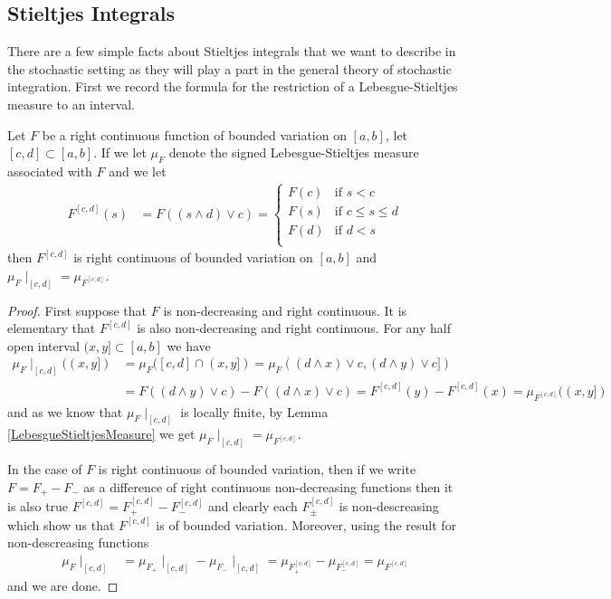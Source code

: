 \subsection{Stieltjes Integrals}

There are a few simple facts about Stieltjes integrals that we want to describe in the stochastic setting as they will play a part in the general theory of stochastic integration.  First we record the formula for the restriction of a Lebesgue-Stieltjes measure to an interval.
\begin{lem}\label{RestrictionOfLebesgueStieltjesMeasure}Let $F$ be a right continuous function of bounded variation on $[a,b]$, let $[c,d] \subset [a,b]$.  If we let $\mu_F$ denote the signed Lebesgue-Stieltjes measure associated with $F$ and we let
\begin{align*}
F^{[c,d]}(s) &=
F((s \wedge d) \vee c) = 
\begin{cases}
F(c) & \text{if $s < c$}\\
F(s) & \text{if $c \leq s \leq d$} \\
F(d) & \text{if $d < s$} \\
\end{cases}
\end{align*}
then $F^{[c,d]}$ is right continuous of bounded variation on $[a,b]$ and $\mu_F \mid_{[c,d]} = \mu_{F^{[c,d]}}$.  
\end{lem}
\begin{proof}
First suppose that $F$ is non-decreasing and right continuous.  It is elementary that $F^{[c,d]}$ is also non-decreasing and right continuous.  For any half open interval $(x,y] \subset [a,b]$ we have 
\begin{align*}
\mu_F\mid_{[c,d]}((x,y]) &= \mu_F ([c,d] \cap (x,y]) = \mu_F ((d \wedge x) \vee c, (d \wedge y) \vee c]) \\
&= F((d \wedge y) \vee c) - F((d \wedge x) \vee c) = F^{[c,d]}(y) - F^{[c,d]}(x) = \mu_{F^{[c,d]}}((x,y])
\end{align*}
and as we know that $\mu_F \mid_{[c,d]}$ is locally finite, by Lemma \ref{LebesgueStieltjesMeasure} we get $\mu_F\mid_{[c,d]} = \mu_{F^{[c,d]}}$.

In the case of $F$ is right continuous  of bounded variation, then if we write $F = F_+ - F_-$ as a difference of right continuous non-decreasing functions then it is also true $F^{[c,d]} = F^{[c,d]}_+ - F^{[c,d]}_-$ and clearly each $F^{[c,d]}_\pm$ is non-descreasing which show us that $F^{[c,d]}$ is of bounded variation.  Moreover, using the result for non-descreasing functions
\begin{align*}
\mu_F\mid_{[c,d]} &= \mu_{F_+}\mid_{[c,d]} - \mu_{F_-} \mid_{[c,d]} = \mu_{F^{[c,d]}_+} - \mu_{F^{[c,d]}_-} = \mu_{F^{[c,d]}}
\end{align*}
and we are done.
\end{proof}

